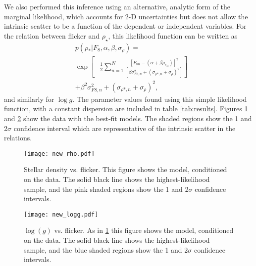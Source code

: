 \documentclass[apjl]{emulateapj}
\newcommand{\logg}{$\log g$}
\newcommand{\rhostar}{$\rho_{\star}$}
\begin{document}
We also performed this inference using an alternative, analytic form of the
marginal likelihood, which accounts for 2-D uncertainties but does not allow
the intrinsic scatter to be a function of the dependent or independent
variables.
For the relation between flicker and \rhostar, this likelihood function can be
written as
\begin{eqnarray}
	& p(\rho_*| F_8, \alpha, \beta, \sigma_{\rho}) =  \\ \nonumber
						      & \exp \left[-\frac{1}{2}
		\sum_{n=1}^N \frac{[F_{8n}-(\alpha + \beta \rho_{*n})]^2}
	{\left[\beta \sigma_{F8, n}^2 + (\sigma_{\rho *, n}
	+ \sigma_{\rho})^2\right]}\right]
	\\ \nonumber
	& + \beta^2 \sigma_{F8, n}^2 + (\sigma_{\rho *, n} + \sigma_{\rho})^2,
\end{eqnarray}
\label{eq:likelihood}
and similarly for \logg.
The parameter values found using this simple likelihood function, with a
constant dispersion are included in table \ref{tab:results}.
Figures \ref{fig:rhostar} and \ref{fig:logg} show the data with the best-fit
models.
The shaded regions show the 1 and 2$\sigma$ confidence interval which are
representative of the intrinsic scatter in the relations.

\begin{figure}
\begin{center}
\texttt{[image: new\_rho.pdf]}
\caption{
Stellar density vs. flicker.
This figure shows the model, conditioned on the data.
The solid black line shows the highest-likelihood sample, and the pink shaded
regions show the 1 and 2$\sigma$ confidence intervals.}
\label{fig:rhostar}
\end{center}
\end{figure}

\begin{figure}
\begin{center}
\texttt{[image: new\_logg.pdf]}
\caption{
$\log(g)$ vs. flicker.
As in \ref{fig:rhostar} this figure shows the model, conditioned on the data.
The solid black line shows the highest-likelihood sample, and the blue shaded
regions show the 1 and 2$\sigma$ confidence intervals.}
\label{fig:logg}
\end{center}
\end{figure}
\end{document}
